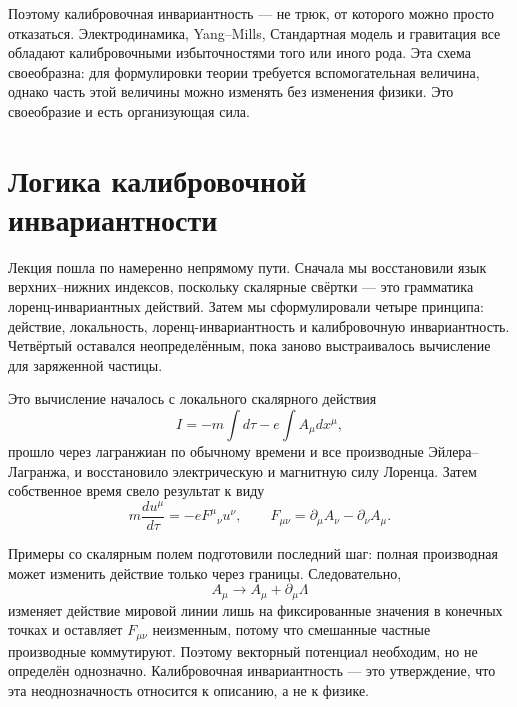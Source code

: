 Поэтому калибровочная инвариантность — не трюк, от которого можно просто отказаться. Электродинамика,
Yang--Mills, Стандартная модель и гравитация все обладают калибровочными
избыточностями того или иного рода. Эта схема своеобразна: для формулировки
теории требуется вспомогательная величина, однако часть этой величины можно
изменять без изменения физики. Это своеобразие и есть
организующая сила.

\section{Логика калибровочной инвариантности}

Лекция пошла по намеренно непрямому пути. Сначала мы восстановили
язык верхних--нижних индексов, поскольку скалярные свёртки — это грамматика
лоренц-инвариантных действий. Затем мы сформулировали четыре принципа: действие,
локальность, лоренц-инвариантность и калибровочную инвариантность.
Четвёртый оставался неопределённым, пока заново выстраивалось вычисление для заряженной частицы.

Это вычисление началось с локального скалярного действия
\begin{equation}
I
=
-m\int d\tau
-e\int A_\mu dx^\mu,
\end{equation}
прошло через лагранжиан по обычному времени и все производные Эйлера--Лагранжа,
и восстановило электрическую и магнитную силу Лоренца. Затем собственное
время свело результат к виду
\begin{equation}
m\frac{du^\mu}{d\tau}
=
-eF^\mu{}_\nu u^\nu,
\qquad
F_{\mu\nu}
=
\partial_\mu A_\nu-\partial_\nu A_\mu.
\end{equation}

Примеры со скалярным полем подготовили последний шаг: полная производная может
изменить действие только через границы. Следовательно,
\begin{equation}
A_\mu\longrightarrow A_\mu+\partial_\mu\Lambda
\end{equation}
изменяет действие мировой линии лишь на фиксированные значения в конечных точках и оставляет
\(F_{\mu\nu}\) неизменным, потому что смешанные частные производные коммутируют. Поэтому
векторный потенциал необходим, но не определён однозначно. Калибровочная инвариантность —
это утверждение, что эта неоднозначность относится к описанию, а не к физике.
